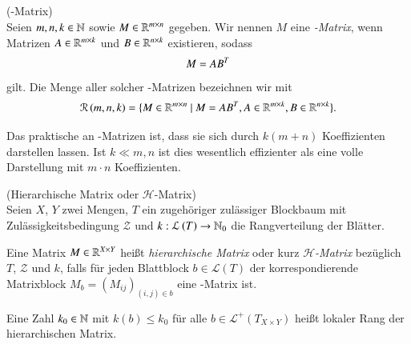   \subsection{\hmat}
  \label{sec:hmat}
    \begin{defn}
      (\Rk-Matrix)\\
      Seien $m,n,k \in \mathbb{N}$ sowie $M \in \mathbb{R}^{m \times n}$ gegeben. Wir nennen $M$ eine \textit{\Rk-Matrix}, wenn Matrizen $A \in \mathbb{R}^{m \times k}$ und $B \in \mathbb{R}^{n \times k}$  existieren, sodass
      \begin{equation*}
	M = A B^T
      \end{equation*}
      gilt. Die Menge aller solcher \Rk-Matrizen bezeichnen wir mit
      \begin{equation*}
	\mathcal{R}\left(m,n,k\right) = \{M \in \mathbb{R}^{m \times n} \ | \ M = AB^T, A \in \mathbb{R}^{m \times k}, B \in \mathbb{R}^{n \times k}\}.
      \end{equation*}
      \citep{nichtlokop}
    \end{defn}
    
    Das praktische an \Rk-Matrizen ist, dass sie sich durch $k\left(m+n\right)$ Koeffizienten darstellen lassen. Ist $k \ll m,n$ ist dies wesentlich effizienter als eine volle Darstellung mit $m \cdot n$ 
    Koeffizienten. \citep{nichtlokop}
    
    \begin{defn}
    \label{def:hmat}
      (Hierarchische Matrix oder $\mathcal{H}$-Matrix)\\
      Seien $X$, $Y$ zwei Mengen, $T$ ein zugehöriger zulässiger Blockbaum mit Zulässigkeitsbedingung $\mathcal{Z}$ und $k: \mathcal{L}\left(T\right) \to \mathbb{N}_0$ die Rangverteilung der Blätter.
      
      Eine Matrix $M \in \mathbb{R}^{X \times Y}$ heißt \textit{hierarchische Matrix} oder kurz \textit{$\mathcal{H}$-Matrix} bezüglich $T$, $\mathcal{Z}$ und $k$, falls für jeden Blattblock
      $b \in \mathcal{L}\left(T\right)$ der korrespondierende Matrixblock $M_b = \left(M_{ij}\right)_{\left(i,j\right) \in b}$ eine \Rk-Matrix ist.
      
      Eine Zahl $k_0 \in \mathbb{N}$ mit $k\left(b\right) \leq k_0$ für alle $b \in \mathcal{L}^+\left(T_{X \times Y}\right)$ heißt lokaler Rang der hierarchischen Matrix.
      
      \citep{h2diss, nichtlokop}
      
    \end{defn}
    
